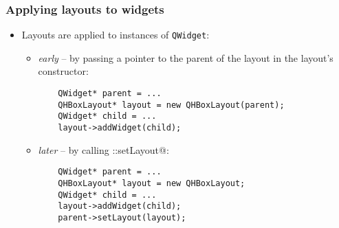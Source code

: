 \begin{frame}[fragile]
  \frametitle{Applying layouts to widgets}
  \begin{itemize}
    \item Layouts are applied to instances of \texttt{QWidget}:
    \begin{itemize}
    \item {\em early} -- by passing a pointer to the parent of the layout in
    the layout's constructor:
    \begin{verbatim}
	QWidget* parent = ...
	QHBoxLayout* layout = new QHBoxLayout(parent);
	QWidget* child = ...
	layout->addWidget(child);
    \end{verbatim}
    \item {\em later} -- by calling \verb@QWidget::setLayout@:
    \begin{verbatim}
	QWidget* parent = ...
	QHBoxLayout* layout = new QHBoxLayout;
	QWidget* child = ...
	layout->addWidget(child);
	parent->setLayout(layout);
    \end{verbatim}
    \end{itemize}
  \end{itemize}
\end{frame}

